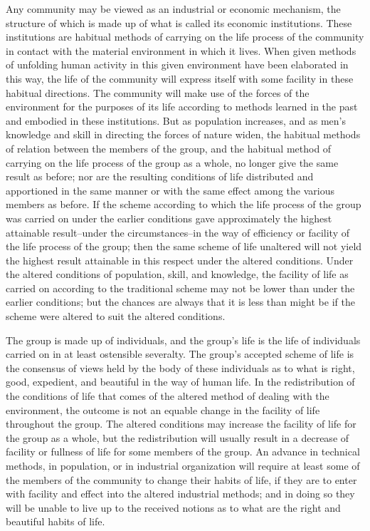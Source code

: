 \documentclass[12pt]{report}
\begin{document}
Any community may be viewed as an industrial or economic mechanism,
the structure of which is made up of what is called its economic
institutions. These institutions are habitual methods of carrying on the
life process of the community in contact with the material environment
in which it lives. When given methods of unfolding human activity in
this given environment have been elaborated in this way, the life of
the community will express itself with some facility in these habitual
directions. The community will make use of the forces of the environment
for the purposes of its life according to methods learned in the past
and embodied in these institutions. But as population increases, and as
men's knowledge and skill in directing the forces of nature widen, the
habitual methods of relation between the members of the group, and the
habitual method of carrying on the life process of the group as a
whole, no longer give the same result as before; nor are the resulting
conditions of life distributed and apportioned in the same manner or
with the same effect among the various members as before. If the scheme
according to which the life process of the group was carried on under
the earlier conditions gave approximately the highest attainable
result--under the circumstances--in the way of efficiency or facility
of the life process of the group; then the same scheme of life unaltered
will not yield the highest result attainable in this respect under the
altered conditions. Under the altered conditions of population, skill,
and knowledge, the facility of life as carried on according to the
traditional scheme may not be lower than under the earlier conditions;
but the chances are always that it is less than might be if the scheme
were altered to suit the altered conditions.

The group is made up of individuals, and the group's life is the life
of individuals carried on in at least ostensible severalty. The group's
accepted scheme of life is the consensus of views held by the body of
these individuals as to what is right, good, expedient, and beautiful in
the way of human life. In the redistribution of the conditions of life
that comes of the altered method of dealing with the environment, the
outcome is not an equable change in the facility of life throughout the
group. The altered conditions may increase the facility of life for
the group as a whole, but the redistribution will usually result in a
decrease of facility or fullness of life for some members of the
group. An advance in technical methods, in population, or in industrial
organization will require at least some of the members of the community
to change their habits of life, if they are to enter with facility and
effect into the altered industrial methods; and in doing so they will be
unable to live up to the received notions as to what are the right and
beautiful habits of life.
\end{document}
